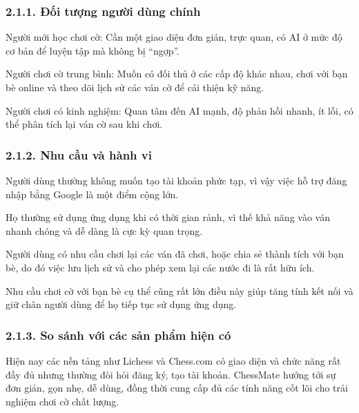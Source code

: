 \documentclass[a4paper,12pt]{article}
\begin{document}
\subsubsection*{2.1.1. Đối tượng người dùng chính}%

\noindent Người mới học chơi cờ: Cần một giao diện đơn giản, trực quan, có AI ở mức độ cơ bản để luyện tập mà không bị ``ngợp''.

\noindent Người chơi cờ trung bình: Muốn có đối thủ ở các cấp độ khác nhau, chơi với bạn bè online và theo dõi lịch sử các ván cờ để cải thiện kỹ năng.

\noindent Người chơi có kinh nghiệm: Quan tâm đến AI mạnh, độ phản hồi nhanh, ít lỗi, có thể phân tích lại ván cờ sau khi chơi.

\subsubsection*{2.1.2. Nhu cầu và hành vi}%

\noindent Người dùng thường không muốn tạo tài khoản phức tạp, vì vậy việc hỗ trợ đăng nhập bằng Google là một điểm cộng lớn.

\noindent Họ thường sử dụng ứng dụng khi có thời gian rảnh, vì thế khả năng vào ván nhanh chóng và dễ dàng là cực kỳ quan trọng.

\noindent Người dùng có nhu cầu chơi lại các ván đã chơi, hoặc chia sẻ thành tích với bạn bè, do đó việc lưu lịch sử và cho phép xem lại các nước đi là rất hữu ích.

\noindent Nhu cầu chơi cờ với bạn bè cụ thể cũng rất lớn \textendash{} điều này giúp tăng tính kết nối và giữ chân người dùng để họ tiếp tục sử dụng ứng dụng.

\subsubsection*{2.1.3. So sánh với các sản phẩm hiện có}

\noindent Hiện nay các nền tảng như Lichess và Chess.com có giao diện và chức năng rất đầy đủ nhưng thường đòi hỏi đăng ký, tạo tài khoản. ChessMate hướng tới sự đơn giản, gọn nhẹ, dễ dùng, đồng thời cung cấp đủ các tính năng cốt lõi cho trải nghiệm chơi cờ chất lượng.

\bigskip %
\end{document}

